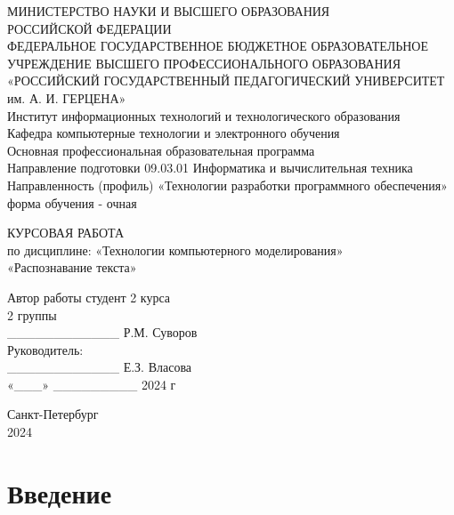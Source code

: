 \documentclass[14pt]{extreport}
\begin{document}
МИНИСТЕРСТВО НАУКИ И ВЫСШЕГО ОБРАЗОВАНИЯ \\
РОССИЙСКОЙ ФЕДЕРАЦИИ \\
ФЕДЕРАЛЬНОЕ ГОСУДАРСТВЕННОЕ БЮДЖЕТНОЕ ОБРАЗОВАТЕЛЬНОЕ УЧРЕЖДЕНИЕ ВЫСШЕГО ПРОФЕССИОНАЛЬНОГО ОБРАЗОВАНИЯ \\
«РОССИЙСКИЙ ГОСУДАРСТВЕННЫЙ ПЕДАГОГИЧЕСКИЙ УНИВЕРСИТЕТ им. А. И. ГЕРЦЕНА» \\
Институт информационных технологий и технологического образования \\
Кафедра компьютерные технологии и электронного обучения \\
Основная профессиональная образовательная программа \\
Направление подготовки 09.03.01 Информатика и вычислительная техника \\
Направленность (профиль) «Технологии разработки программного обеспечения» \\
форма обучения - очная \\

\vspace{10mm}

\begin{center}
КУРСОВАЯ РАБОТА \\
по дисциплине: «Технологии компьютерного моделирования» \\
«Распознавание текста» \\
\end{center}

\vspace{20mm}

Автор работы студент 2 курса \\
2 группы \\
\_\_\_\_\_\_\_\_\_\_\_\_ Р.М. Суворов \\
Руководитель: \\
\_\_\_\_\_\_\_\_\_\_\_\_ Е.З. Власова \\
«\_\_\_» \_\_\_\_\_\_\_\_\_ 2024 г \\

\vspace{20mm}

\begin{center}
Санкт-Петербург \\
2024
\end{center}

\newpage

\tableofcontents

\newpage

\chapter*{Введение}
\end{document}
